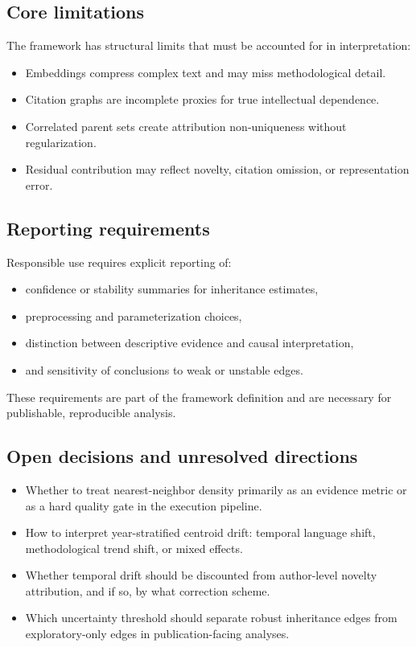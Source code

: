 

\subsection{Core limitations}
The framework has structural limits that must be accounted for in interpretation:
\begin{itemize}
    \item Embeddings compress complex text and may miss methodological detail.
    \item Citation graphs are incomplete proxies for true intellectual dependence.
    \item Correlated parent sets create attribution non-uniqueness without regularization.
    \item Residual contribution may reflect novelty, citation omission, or representation error.
\end{itemize}

\subsection{Reporting requirements}
Responsible use requires explicit reporting of:
\begin{itemize}
    \item confidence or stability summaries for inheritance estimates,
    \item preprocessing and parameterization choices,
    \item distinction between descriptive evidence and causal interpretation,
    \item and sensitivity of conclusions to weak or unstable edges.
\end{itemize}

These requirements are part of the framework definition and are necessary for publishable, reproducible analysis.

\subsection{Open decisions and unresolved directions}
\begin{itemize}
    \item Whether to treat nearest-neighbor density primarily as an evidence metric or as a hard quality gate in the execution pipeline.
    \item How to interpret year-stratified centroid drift: temporal language shift, methodological trend shift, or mixed effects.
    \item Whether temporal drift should be discounted from author-level novelty attribution, and if so, by what correction scheme.
    \item Which uncertainty threshold should separate robust inheritance edges from exploratory-only edges in publication-facing analyses.
\end{itemize}
